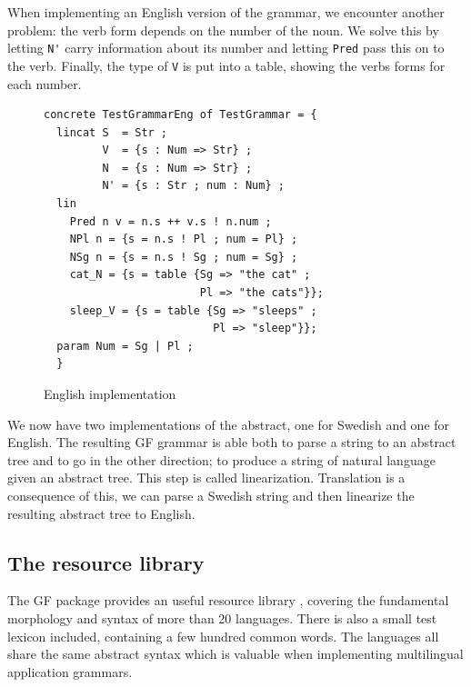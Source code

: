 \documentclass{report}
\begin{document}
When implementing an English version of the grammar, we encounter another
problem: the verb form depends on the number of the noun. We solve this by letting
\verb|N'| carry
information about its number and letting \verb|Pred| pass this on to the
verb. Finally, the type of \verb|V| is put into a table, showing the verbs forms for each
number.
\begin{figure}[h!]
\begin{verbatim}              
concrete TestGrammarEng of TestGrammar = {
  lincat S  = Str ;
         V  = {s : Num => Str} ;
         N  = {s : Num => Str} ;
         N' = {s : Str ; num : Num} ;
  lin   
    Pred n v = n.s ++ v.s ! n.num ;
    NPl n = {s = n.s ! Pl ; num = Pl} ;
    NSg n = {s = n.s ! Sg ; num = Sg} ;
    cat_N = {s = table {Sg => "the cat" ;
                        Pl => "the cats"}};
    sleep_V = {s = table {Sg => "sleeps" ; 
                          Pl => "sleep"}};
  param Num = Sg | Pl ;
  }
\end{verbatim}           
\caption{English implementation}
\label{fig:gfTestEng}
\end{figure}


We now have two implementations of the abstract, one for Swedish and one for English.
The resulting GF grammar is able both to
parse a string to an abstract tree and to go in the other direction; to produce
a string of natural language given an abstract tree. This step is called linearization.
Translation is a consequence of this, we can parse a Swedish string and then 
linearize the resulting abstract tree to English. 

\subsection{The resource library}
\label{sec:resources}
The GF package provides an useful resource library \cite{gf-resource}, covering the
fundamental morphology and syntax of more than 20 languages.
There is also a small test lexicon included, containing a few hundred common
words.
The languages all share the same abstract syntax which is  valuable
when implementing multilingual application grammars.
\end{document}
